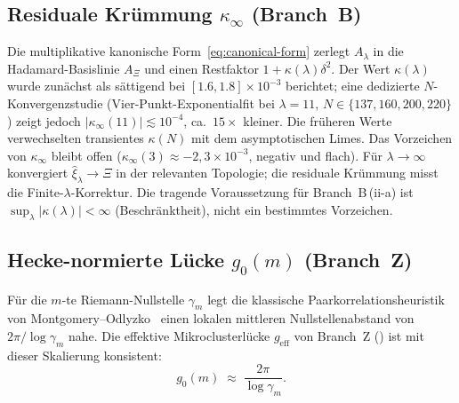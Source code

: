 \documentclass[12pt,a4paper]{article}
\theoremstyle{definition}
\theoremstyle{remark}
\begin{document}
\subsection{\texorpdfstring{Residuale Krümmung $\kappa_\infty$ (Branch~B)}{Residuale Kruemmung kappa-infinity (Branch B)}}

Die multiplikative kanonische Form~\eqref{eq:canonical-form} zerlegt
$A_\lambda$ in die Hadamard-Basislinie $A_\Xi$ und einen Restfaktor
$1+\kappa(\lambda)\delta^2$. Der Wert $\kappa(\lambda)$ wurde zunächst als
sättigend bei $[1.6,1.8]\times 10^{-3}$ berichtet; eine dedizierte
$N$-Konvergenzstudie (Vier-Punkt-Exponentialfit bei $\lambda=11$,
$N\in\{137,160,200,220\}$) zeigt jedoch
$|\kappa_\infty(11)|\lesssim 10^{-4}$, ca.\ $15\times$ kleiner. Die
früheren Werte verwechselten transientes $\kappa(N)$ mit dem asymptotischen
Limes. Das Vorzeichen von $\kappa_\infty$ bleibt offen
($\kappa_\infty(3)\approx -2{,}3\times10^{-3}$, negativ und flach).
Für $\lambda\to\infty$ konvergiert $\hat\xi_\lambda \to \Xi$ in der
relevanten Topologie; die residuale Krümmung misst die
Finite-$\lambda$-Korrektur. Die tragende Voraussetzung für
Branch~B\,(ii-a) ist $\sup_\lambda|\kappa(\lambda)|<\infty$
(Beschränktheit), nicht ein bestimmtes Vorzeichen.

\subsection{\texorpdfstring{Hecke-normierte Lücke $g_0(m)$ (Branch~Z)}{Hecke-normierte Luecke g0(m) (Branch Z)}}

Für die $m$-te Riemann-Nullstelle $\gamma_m$ legt die klassische
Paarkorrelationsheuristik von Montgomery--Odlyzko~\cite{Montgomery1973}
einen lokalen mittleren Nullstellenabstand von
$2\pi/\log\gamma_m$ nahe. Die effektive Mikroclusterlücke
$g_{\text{eff}}$ von Branch~Z () ist
mit dieser Skalierung konsistent:
\[
  g_0(m) \;\approx\; \frac{2\pi}{\log\gamma_m}.
\]

\begin{center}
\small
\renewcommand{\arraystretch}{1.2}
\end{center}
\end{document}
